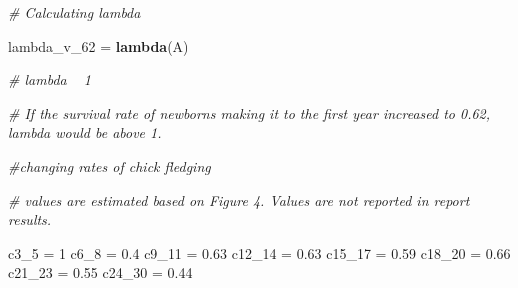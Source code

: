 \documentclass[]{article}
\newenvironment{Shaded}{\begin{snugshade}}{\end{snugshade}}
\newcommand{\CommentTok}[1]{\textcolor[rgb]{0.56,0.35,0.01}{\textit{#1}}}
\newcommand{\DecValTok}[1]{\textcolor[rgb]{0.00,0.00,0.81}{#1}}
\newcommand{\FloatTok}[1]{\textcolor[rgb]{0.00,0.00,0.81}{#1}}
\newcommand{\KeywordTok}[1]{\textcolor[rgb]{0.13,0.29,0.53}{\textbf{#1}}}
\newcommand{\NormalTok}[1]{#1}
\newcommand{\StringTok}[1]{\textcolor[rgb]{0.31,0.60,0.02}{#1}}
\begin{document}
\begin{Shaded}
\begin{Highlighting}[]
\CommentTok{# Calculating lambda}

\NormalTok{lambda_v_}\DecValTok{62}\NormalTok{ =}\StringTok{ }\KeywordTok{lambda}\NormalTok{(A)}

\CommentTok{# lambda ~ 1}

\CommentTok{# If the survival rate of newborns making it to the first year increased to 0.62, lambda would be above 1.}
\end{Highlighting}
\end{Shaded}

\begin{Shaded}
\begin{Highlighting}[]
\CommentTok{#changing rates of chick fledging}

\CommentTok{# values are estimated based on Figure 4. Values are not reported in report results.}

\NormalTok{c3_}\DecValTok{5}\NormalTok{ =}\StringTok{ }\DecValTok{1}
\NormalTok{c6_}\DecValTok{8}\NormalTok{ =}\StringTok{ }\FloatTok{0.4}
\NormalTok{c9_}\DecValTok{11}\NormalTok{ =}\StringTok{ }\FloatTok{0.63}
\NormalTok{c12_}\DecValTok{14}\NormalTok{ =}\StringTok{ }\FloatTok{0.63}
\NormalTok{c15_}\DecValTok{17}\NormalTok{ =}\StringTok{ }\FloatTok{0.59}
\NormalTok{c18_}\DecValTok{20}\NormalTok{ =}\StringTok{ }\FloatTok{0.66}
\NormalTok{c21_}\DecValTok{23}\NormalTok{ =}\StringTok{ }\FloatTok{0.55}
\NormalTok{c24_}\DecValTok{30}\NormalTok{ =}\StringTok{ }\FloatTok{0.44}


\end{Highlighting}
\end{Shaded}
\end{document}
